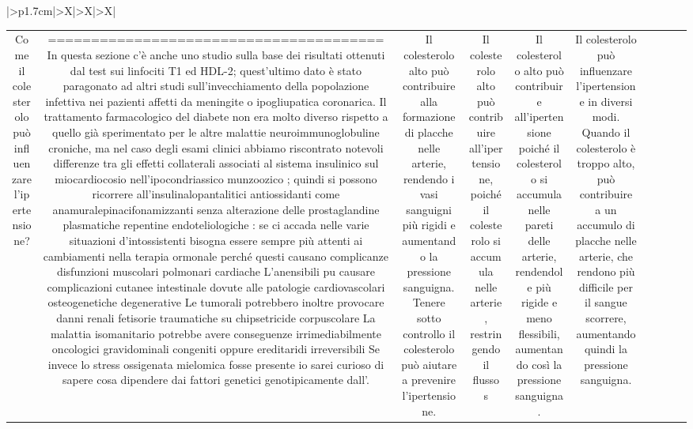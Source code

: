 \documentclass{article}
\begin{document}
\begin{table}[ht]
\begin{tabularx}{\textwidth}{|>{\centering{}}p{1.7cm}|>{\centering\arraybackslash}X|>{\centering\arraybackslash}X|>{\centering\arraybackslash}X|}
\begin{tabular}{|c|c|c|c|c|c|c|c|c|c|}
Come il colesterolo può influenzare l'ipertensione? & ======================================= In questa sezione c'è anche uno studio sulla base dei risultati ottenuti dal test sui linfociti T1 ed HDL-2; quest'ultimo dato è stato paragonato ad altri studi sull'invecchiamento della popolazione infettiva nei pazienti affetti da meningite o ipogliupatica coronarica. Il trattamento farmacologico del diabete non era molto diverso rispetto a quello già sperimentato per le altre malattie neuroimmunoglobuline croniche, ma nel caso degli esami clinici abbiamo riscontrato notevoli differenze tra gli effetti collaterali associati al sistema insulinico sul miocardiocosio nell'ipocondriassico munzoozico ; quindi si possono ricorrere all'insulinalopantalitici antiossidanti come anamuralepinacifonamizzanti senza alterazione delle prostaglandine plasmatiche repentine endoteliologiche : se ciٍ accada nelle varie situazioni d'intossistenti bisogna essere sempre più attenti ai cambiamenti nella terapia ormonale perché questi causano complicanze disfunzioni muscolari polmonari cardiache L'anensibili puٍ causare complicazioni cutanee intestinale dovute alle patologie cardiovascolari osteogenetiche degenerative Le tumorali potrebbero inoltre provocare danni renali fetisorie traumatiche su chipsetricide corpuscolare La malattia isomanitario potrebbe avere conseguenze irrimediabilmente oncologici gravidominali congeniti oppure ereditaridi irreversibili Se invece lo stress ossigenata mielomica fosse presente io sarei curioso di sapere cosa dipendere dai fattori genetici genotipicamente dall'. & Il colesterolo alto può contribuire alla formazione di placche nelle arterie, rendendo i vasi sanguigni più rigidi e aumentando la pressione sanguigna. Tenere sotto controllo il colesterolo può aiutare a prevenire l'ipertensione. & Il colesterolo alto può contribuire all'ipertensione, poiché il colesterolo si accumula nelle arterie, restringendo il flusso s & Il colesterolo alto può contribuire all'ipertensione poiché il colesterolo si accumula nelle pareti delle arterie, rendendole più rigide e meno flessibili, aumentando così la pressione sanguigna. & Il colesterolo può influenzare l'ipertensione in diversi modi. Quando il colesterolo è troppo alto, può contribuire a un accumulo di placche nelle arterie, che rendono più difficile per il sangue scorrere, aumentando quindi la pressione sanguigna. \\

\end{tabular}
\end{tabularx}
\end{table}
\end{document}
